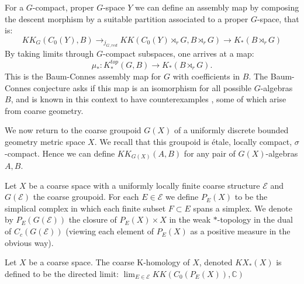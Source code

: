 \begin{remark}
For a $G$-compact, proper $G$-space $Y$ we can define an assembly map by composing the descent morphism by a suitable partition associated to a proper $G$-space, that is:
\begin{equation*}
KK_{G}(C_{0}(Y),B) \rightarrow_{j_{G,red}} KK(C_{0}(Y)\rtimes_{r}G, B\rtimes_{r} G) \rightarrow K_{*}(B\rtimes_{r}G)
\end{equation*}
By taking limits through $G$-compact subspaces, one arrives at a map:
\begin{equation*}
\mu_{*}:K^{top}_{*}(G,B)\rightarrow K_{*}(B\rtimes_{r}G).
\end{equation*}
This is the Baum-Connes assembly map for $G$ with coefficients in $B$. The Baum-Connes conjecture asks if this map is an isomorphism for all possible $G$-algebras $B$, and is known in this context to have counterexamples \cite{MR1911663}, some of which arise from coarse geometry.
\end{remark}

We now return to the coarse groupoid $G(X)$ of a uniformly discrete bounded geometry metric space $X$. We recall that this groupoid is \'etale, locally compact, $\sigma$-compact. Hence we can define $KK_{G(X)}(A,B)$ for any pair of $G(X)$-algebras $A,B$. 

\begin{definition}
Let $X$ be a coarse space with a uniformly locally finite coarse structure $\mathcal{E}$ and $G(\mathcal{E})$ the coarse groupoid. For each $E \in \mathcal{E}$ we define $P_{E}(X)$ to be the simplical complex in which each finite subset $F \subset E$ spans a simplex. We denote by $P_{E}(G(\mathcal{E}))$ the closure of $P_{E}(X)\times X$ in the weak $*$-topology in the dual of $C_{c}(G(\mathcal{E}))$ (viewing each element of $P_{E}(X)$ as a positive measure in the obvious way).
\end{definition}

\begin{definition}
Let $X$ be a coarse space. The coarse K-homology of $X$, denoted $KX_{*}(X)$ is defined to be the directed limit: $\lim_{E \in \mathcal{E}}KK(C_{0}(P_{E}(X)),\mathbb{C})$
\end{definition}

